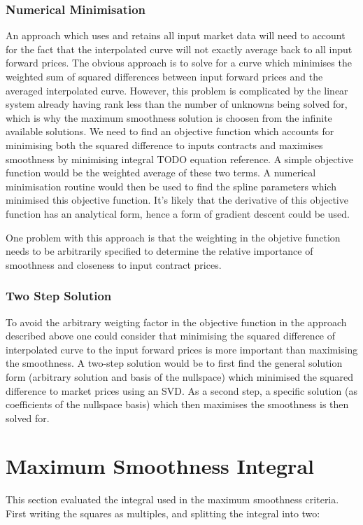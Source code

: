 \documentclass{article}
\begin{document}
\subsubsection{Numerical Minimisation}
An approach which uses and retains all input market data will need to account
for the fact that the interpolated curve will not exactly average back to all input
forward prices. The obvious approach is to solve for a curve which minimises the
weighted sum of squared differences between input forward prices and the averaged 
interpolated curve. However, this problem is complicated by the linear system
already having rank less than the number of unknowns being solved for, which is why
the maximum smoothness solution is choosen from the infinite available solutions.
We need to find an objective function which accounts for minimising both the squared
difference to inputs contracts and maximises smoothness by minimising integral 
TODO equation reference. A simple objective function would be the weighted average
of these two terms. A numerical minimisation routine would then be used to find the
spline parameters which minimised this objective function. It's likely that the
derivative of this objective function has an analytical form, hence a form of
gradient descent could be used.

\bigskip

One problem with this approach is that the weighting in the objetive function
needs to be arbitrarily specified to determine the relative importance of smoothness
and closeness to input contract prices.

\subsubsection{Two Step Solution}
To avoid the arbitrary weigting factor in the objective function in the approach 
described above one could consider that minimising the squared difference of interpolated
curve to the input forward prices is more important than maximising the smoothness.
A two-step solution would be to first find the general solution form (arbitrary solution
and basis of the nullspace) which minimised the squared difference to market
prices using an SVD. As a second step, a specific solution (as coefficients of the 
nullspace basis) which then maximises the smoothness is then solved for.


\newpage
\appendix
\appendixpage
\section{Maximum Smoothness Integral}
\label{appendix:max_smooth_integral}
This section evaluated the integral used in the maximum smoothness criteria. First writing
the squares as multiples, and splitting the integral into two:
\end{document}
